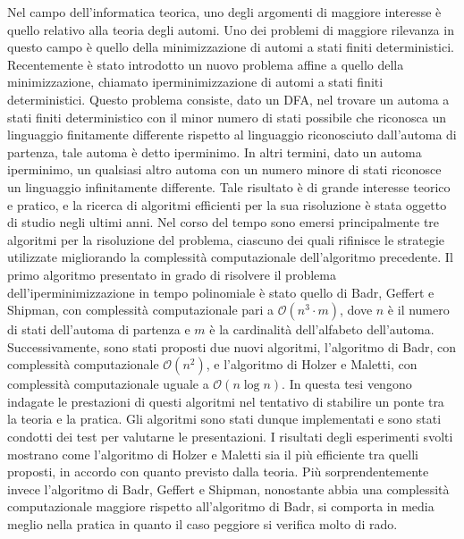 \documentclass[a4paper,12pt]{report} %
\newcommand{\bigo}[0]{\mathcal{O}}            %
\begin{document}
Nel campo dell'informatica teorica, uno degli argomenti di maggiore interesse è quello relativo alla 
teoria degli automi. Uno dei problemi di maggiore rilevanza in questo campo è quello della minimizzazione
di automi a stati finiti deterministici. Recentemente è stato introdotto un nuovo problema affine a quello
della minimizzazione, chiamato iperminimizzazione di automi a stati finiti deterministici. Questo problema
consiste, dato un DFA, nel trovare un automa a stati finiti deterministico con il minor
numero di stati possibile che riconosca un linguaggio finitamente
differente rispetto al linguaggio riconosciuto dall'automa di partenza, tale automa è detto iperminimo. 
In altri termini, dato un automa iperminimo, un qualsiasi altro automa
con un numero minore di stati riconosce un linguaggio infinitamente differente.
Tale risultato è di grande interesse teorico e pratico, e la ricerca di algoritmi efficienti per la sua
risoluzione è stata oggetto di studio negli ultimi anni. Nel corso del tempo sono emersi principalmente 
tre algoritmi per la risoluzione del problema, ciascuno dei quali rifinisce le strategie utilizzate migliorando
la complessità computazionale dell'algoritmo precedente. Il primo algoritmo presentato in grado di risolvere
il problema dell'iperminimizzazione in tempo polinomiale è stato quello di Badr, Geffert e Shipman, con 
complessità computazionale pari a $\bigo(n^3 \cdot m)$, dove $n$ è il numero di stati dell'automa di partenza
e $m$ è la cardinalità dell'alfabeto dell'automa.
Successivamente, sono stati proposti due nuovi algoritmi, l'algoritmo di Badr, con complessità
computazionale $\bigo(n^2)$, e l'algoritmo di Holzer e Maletti, con complessità computazionale 
uguale a $\bigo(n \log n)$. In questa tesi vengono indagate le prestazioni di questi
algoritmi nel tentativo di stabilire un ponte tra la teoria e la pratica. Gli algoritmi sono stati
dunque implementati e sono stati condotti dei test per valutarne le presentazioni.
I risultati degli esperimenti svolti mostrano come l'algoritmo di Holzer e Maletti sia il più efficiente tra quelli proposti, 
in accordo con quanto previsto dalla teoria. Più sorprendentemente invece l'algoritmo di Badr, Geffert e Shipman, 
nonostante abbia una complessità computazionale maggiore rispetto all'algoritmo di Badr, 
si comporta in media meglio nella pratica in quanto il caso peggiore si verifica molto di rado.

\end{document}
